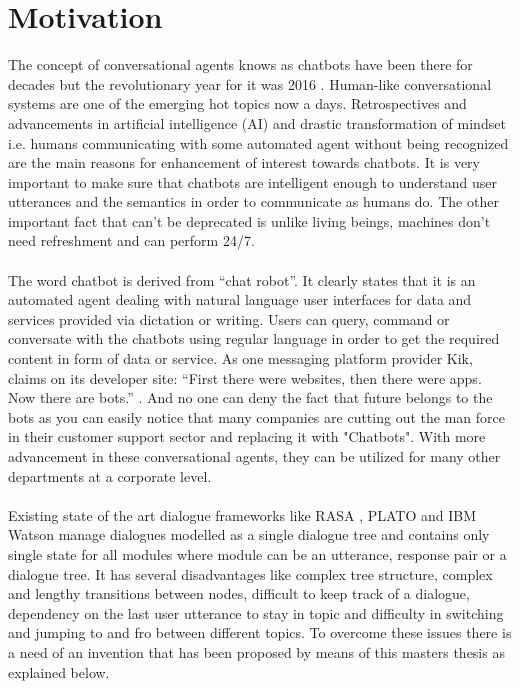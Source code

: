 \section{Motivation}
The concept of conversational agents knows as chatbots have been there for decades but the revolutionary year for it was 2016 \cite{ChatbotsChangingUserNeedsMotivations}.  Human-like conversational systems are one of  the  emerging  hot  topics  now  a  days.   Retrospectives  and  advancements  in  artificial intelligence (AI) and drastic transformation of mindset i.e.  humans communicating with some automated agent without being recognized are the main reasons for enhancement of interest towards chatbots.  It is very important to make sure that chatbots are intelligent enough to understand user utterances and the semantics in order to communicate as humans do.  The other important fact that can’t be deprecated is unlike living beings, machines don’t need refreshment and can perform 24/7.
\\~\\
The word chatbot is derived from “chat robot”. It  clearly  states  that  it  is  an  automated agent dealing with natural language user interfaces for data and services provided via dictation or writing. Users can query, command or conversate with the chatbots using regular language in order to get the required content in form of data or service.  As one messaging platform provider Kik, claims on its developer site:  “First there were websites, then there were apps.  Now there are bots.” \cite{ChatbotsChangingUserNeedsMotivations}. And no one can deny the fact that future belongs to the bots as you can easily notice that many companies are cutting out the man force in their customer support sector and replacing it with "Chatbots". With more advancement in these conversational agents, they can be utilized for many other departments at a corporate level.
\\~\\
Existing state of the art dialogue frameworks like RASA \cite{rasa}, PLATO \cite{plato} and IBM Watson \cite{ibmwatson} manage dialogues modelled as a single dialogue tree and contains only single state for all modules where module can be an utterance, response pair or a dialogue tree. It has several disadvantages like complex tree structure, complex and lengthy transitions between nodes, difficult to keep track of a dialogue, dependency on the last user utterance to stay in topic and difficulty in switching and jumping to and fro between different topics. To overcome these issues there is a need of an invention that has been proposed by means of this masters thesis as explained below.

